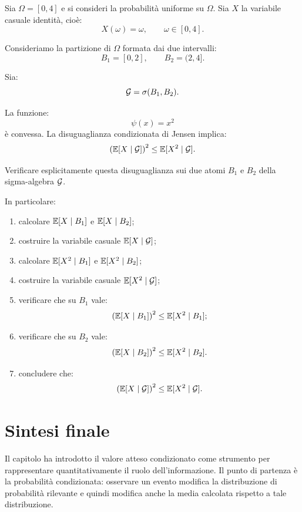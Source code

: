 \begin{exercise}
\label{ex:cap3-prop-jensen-condizionata}

Sia $\Omega=[0,4]$ e si consideri la probabilit\`{a} uniforme su $\Omega$.
Sia $X$ la variabile casuale identit\`{a}, cio\`{e}:
\[
X(\omega)=\omega,
\qquad
\omega\in[0,4].
\]

Consideriamo la partizione di $\Omega$ formata dai due intervalli:
\[
B_1=[0,2],
\qquad
B_2=(2,4].
\]

Sia:
\[
\mathcal{G}
=
\sigma(B_1,B_2).
\]

La funzione:
\[
\psi(x)=x^2
\]
\`{e} convessa. La disuguaglianza condizionata di Jensen implica:
\[
\left(
\mathbb{E}[X\mid\mathcal{G}]
\right)^2
\leq
\mathbb{E}[X^2\mid\mathcal{G}].
\]

Verificare esplicitamente questa disuguaglianza sui due atomi $B_1$ e $B_2$
della sigma-algebra $\mathcal{G}$.

In particolare:

\begin{enumerate}
    \item calcolare $\mathbb{E}[X\mid B_1]$ e $\mathbb{E}[X\mid B_2]$;

    \item costruire la variabile casuale $\mathbb{E}[X\mid\mathcal{G}]$;

    \item calcolare $\mathbb{E}[X^2\mid B_1]$ e $\mathbb{E}[X^2\mid B_2]$;

    \item costruire la variabile casuale $\mathbb{E}[X^2\mid\mathcal{G}]$;

    \item verificare che su $B_1$ vale:
    \[
    \left(
    \mathbb{E}[X\mid B_1]
    \right)^2
    \leq
    \mathbb{E}[X^2\mid B_1];
    \]

    \item verificare che su $B_2$ vale:
    \[
    \left(
    \mathbb{E}[X\mid B_2]
    \right)^2
    \leq
    \mathbb{E}[X^2\mid B_2].
    \]

    \item concludere che:
    \[
    \left(
    \mathbb{E}[X\mid\mathcal{G}]
    \right)^2
    \leq
    \mathbb{E}[X^2\mid\mathcal{G}].
    \]
\end{enumerate}

\end{exercise}

\section{Sintesi finale}

Il capitolo ha introdotto il valore atteso condizionato come strumento per
rappresentare quantitativamente il ruolo dell'informazione. Il punto di
partenza \`{e} la probabilit\`{a} condizionata: osservare un evento modifica la
distribuzione di probabilit\`{a} rilevante e quindi modifica anche la media
calcolata rispetto a tale distribuzione.

